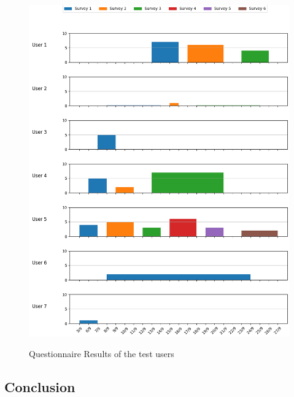 \vspace{5mm}

\FloatBarrier
\begin{figure}[ht]
    \centering
    \includegraphics[width=\linewidth]{figures/Figure-Scores.png}\label{fig:questionnaire-results}
    \caption{Questionnaire Results of the test users}
\end{figure}
\FloatBarrier

\vspace{5mm}

\subsection{Conclusion}

